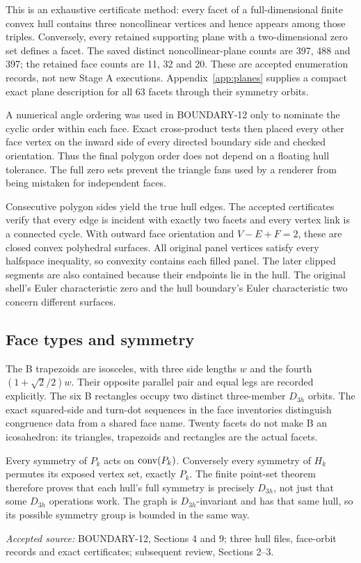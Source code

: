 \documentclass[11pt,a4paper]{article}
\newcommand{\source}[1]{\par{\small\emph{Accepted source:} #1}\par}
\begin{document}
This is an exhaustive certificate method: every facet of a full-dimensional finite convex hull contains three noncollinear vertices and hence appears among those triples. Conversely, every retained supporting plane with a two-dimensional zero set defines a facet. The saved distinct noncollinear-plane counts are 397, 488 and 397; the retained face counts are 11, 32 and 20. These are accepted enumeration records, not new Stage A executions. Appendix~\ref{app:planes} supplies a compact exact plane description for all 63 facets through their symmetry orbits.

A numerical angle ordering was used in BOUNDARY-12 only to nominate the cyclic order within each face. Exact cross-product tests then placed every other face vertex on the inward side of every directed boundary side and checked orientation. Thus the final polygon order does not depend on a floating hull tolerance. The full zero sets prevent the triangle fans used by a renderer from being mistaken for independent faces.

Consecutive polygon sides yield the true hull edges. The accepted certificates verify that every edge is incident with exactly two facets and every vertex link is a connected cycle. With outward face orientation and $V-E+F=2$, these are closed convex polyhedral surfaces. All original panel vertices satisfy every halfspace inequality, so convexity contains each filled panel. The later clipped segments are also contained because their endpoints lie in the hull. The original shell's Euler characteristic zero and the hull boundary's Euler characteristic two concern different surfaces.

\subsection{Face types and symmetry}
The B trapezoids are isosceles, with three side lengths $w$ and the fourth $(1+\sqrt2/2)w$. Their opposite parallel pair and equal legs are recorded explicitly. The six B rectangles occupy two distinct three-member $D_{3h}$ orbits. The exact squared-side and turn-dot sequences in the face inventories distinguish congruence data from a shared face name. Twenty facets do not make B an icosahedron: its triangles, trapezoids and rectangles are the actual facets.

Every symmetry of $P_k$ acts on $\operatorname{conv}(P_k)$. Conversely every symmetry of $H_k$ permutes its exposed vertex set, exactly $P_k$. The finite point-set theorem therefore proves that each hull's full symmetry is precisely $D_{3h}$, not just that some $D_{3h}$ operations work. The graph is $D_{3h}$-invariant and has that same hull, so its possible symmetry group is bounded in the same way.
\source{BOUNDARY-12, Sections 4 and 9; three hull files, face-orbit records and exact certificates; subsequent review, Sections 2--3.}
\end{document}
